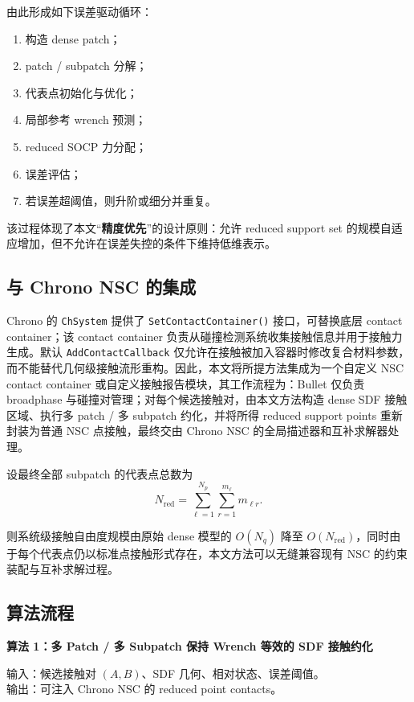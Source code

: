 由此形成如下误差驱动循环：
\begin{enumerate}[label=\arabic*.]
    \item 构造 dense patch；
    \item patch / subpatch 分解；
    \item 代表点初始化与优化；
    \item 局部参考 wrench 预测；
    \item reduced SOCP 力分配；
    \item 误差评估；
    \item 若误差超阈值，则升阶或细分并重复。
\end{enumerate}

该过程体现了本文“\textbf{精度优先}”的设计原则：允许 reduced support set 的规模自适应增加，但不允许在误差失控的条件下维持低维表示。

\subsection{与 Chrono NSC 的集成}

Chrono 的 \verb|ChSystem| 提供了 \verb|SetContactContainer()| 接口，可替换底层 contact container；该 contact container 负责从碰撞检测系统收集接触信息并用于接触力生成。默认 \verb|AddContactCallback| 仅允许在接触被加入容器时修改复合材料参数，而不能替代几何级接触流形重构。因此，本文将所提方法集成为一个自定义 NSC contact container 或自定义接触报告模块，其工作流程为：Bullet 仅负责 broadphase 与碰撞对管理；对每个候选接触对，由本文方法构造 dense SDF 接触区域、执行多 patch / 多 subpatch 约化，并将所得 reduced support points 重新封装为普通 NSC 点接触，最终交由 Chrono NSC 的全局描述器和互补求解器处理。

设最终全部 subpatch 的代表点总数为
\begin{equation}
N_{\mathrm{red}} = \sum_{\ell=1}^{N_p}\sum_{r=1}^{m_\ell} m_{\ell r}.
\end{equation}

则系统级接触自由度规模由原始 dense 模型的 $O(N_q)$ 降至 $O(N_{\mathrm{red}})$，同时由于每个代表点仍以标准点接触形式存在，本文方法可以无缝兼容现有 NSC 的约束装配与互补求解过程。

\subsection{算法流程}

\noindent\textbf{算法 1：多 Patch / 多 Subpatch 保持 Wrench 等效的 SDF 接触约化}

\noindent 输入：候选接触对 $(A,B)$、SDF 几何、相对状态、误差阈值。\\
\noindent 输出：可注入 Chrono NSC 的 reduced point contacts。

